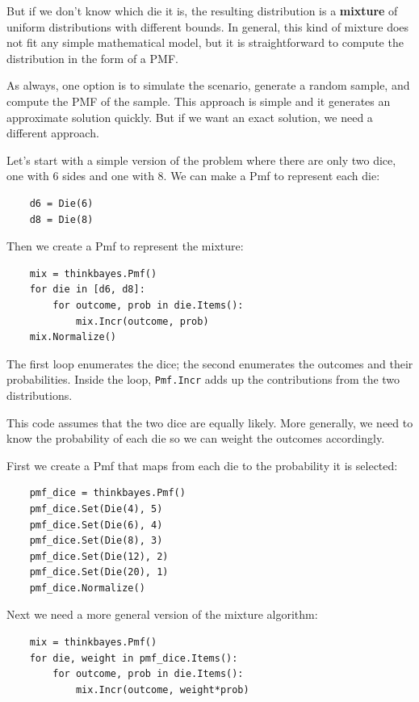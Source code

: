 \documentclass[12pt]{book}
\begin{document}
But if we don't know which die it is, the resulting distribution is
a {\bf mixture} of uniform distributions with different bounds.
In general, this kind of mixture does not fit any simple mathematical
model, but it is straightforward to compute the distribution in
the form of a PMF.

As always, one option is to simulate the scenario, generate a random
sample, and compute the PMF of the sample.  This approach is simple
and it generates an approximate solution quickly.  But if we want an
exact solution, we need a different approach.

Let's start with a simple version of the problem where there are
only two dice, one with 6 sides and one with 8.  We can make a Pmf to
represent each die:

\begin{verbatim}
    d6 = Die(6)
    d8 = Die(8)
\end{verbatim}

Then we create a Pmf to represent the mixture:

\begin{verbatim}
    mix = thinkbayes.Pmf()
    for die in [d6, d8]:
        for outcome, prob in die.Items():
            mix.Incr(outcome, prob)
    mix.Normalize()
\end{verbatim}

The first loop enumerates the dice; the second enumerates the
outcomes and their probabilities.  Inside the loop,
{\tt Pmf.Incr} adds up the contributions from the two distributions.

This code assumes that the two dice are equally likely.  More
generally, we need to know the probability of each die so we can
weight the outcomes accordingly.

First we create a Pmf that maps from each die to the probability it is
selected:

\begin{verbatim}
    pmf_dice = thinkbayes.Pmf()
    pmf_dice.Set(Die(4), 5)
    pmf_dice.Set(Die(6), 4)
    pmf_dice.Set(Die(8), 3)
    pmf_dice.Set(Die(12), 2)
    pmf_dice.Set(Die(20), 1)
    pmf_dice.Normalize()
\end{verbatim}

Next we need a more general version of the mixture algorithm:

\begin{verbatim}
    mix = thinkbayes.Pmf()
    for die, weight in pmf_dice.Items():
        for outcome, prob in die.Items():
            mix.Incr(outcome, weight*prob)
\end{verbatim}
\end{document}
